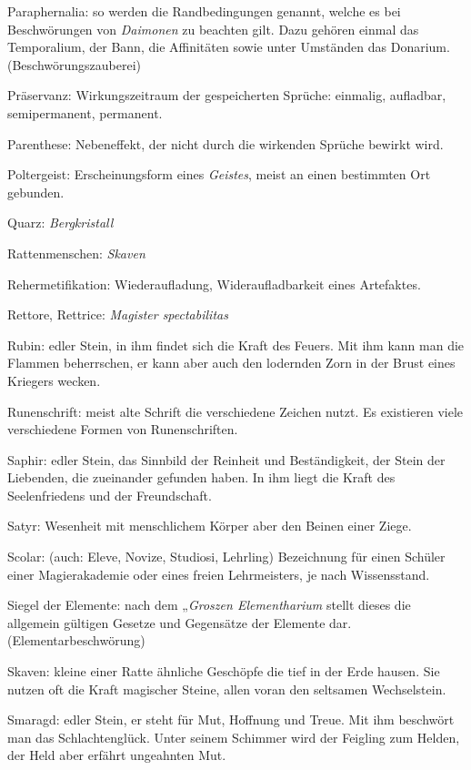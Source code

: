 \documentclass[a5paper,8pt]{book}
\begin{document}
\begin{small}
\begin{description}
 \item Paraphernalia: so werden die Randbedingungen ge­nannt, welche es bei Beschwörungen von \textit{Daimonen} zu beachten gilt. Dazu gehören einmal das \textit{}Temporalium, der Bann, die \textit{}Affinitäten sowie unter Um­ständen das \textit{}Donarium. (\textit{}Beschwörungszauberei)
 \item Präservanz: Wirkungszeitraum der gespeicherten Sprüche: einmalig, aufladbar, semipermanent, permanent.
 \item Parenthese: Nebeneffekt, der nicht durch die wirkenden Sprüche bewirkt wird.
 \item Poltergeist: Erscheinungsform eines \textit{Geistes}, meist an einen bestimmten Ort gebunden.
 \item Quarz: \textit{Bergkristall}
 \item Rattenmenschen: \textit{Skaven}
 \item Rehermetifikation: Wiederaufladung, Wideraufladbarkeit eines Artefaktes.
 \item Rettore, Rettrice: \textit{Magister spectabilitas}
 \item Rubin: edler Stein, in ihm findet sich die Kraft des Feuers. Mit ihm kann man die Flammen beherrschen, er kann aber auch den lodernden Zorn in der Brust eines Kriegers wecken.
 \item Runenschrift: meist alte Schrift die verschiedene Zeichen nutzt. Es existieren viele verschiedene Formen von Runenschriften.
 \item Saphir: edler Stein, das Sinnbild der Rein­heit und Beständigkeit, der Stein der Liebenden, die zueinander gefunden haben. In ihm liegt die Kraft des Seelenfriedens und der Freundschaft.
 \item Satyr: Wesenheit mit menschlichem Körper aber den Beinen einer Ziege.
 \item Scolar: (auch: Eleve, Novize, Studiosi, Lehrling) Bezeichnung für einen Schüler einer Magierakademie oder eines freien Lehr­meisters, je nach Wissensstand. 
 \item Siegel der Elemente: nach dem „\textit{Groszen Elemen­tharium} stellt dieses die allgemein gültigen Gesetze und Gegensätze der Elemente dar. (\textit{}Elementarbeschwörung)
 \item Skaven: kleine einer Ratte ähnliche Geschöpfe die tief in der Erde hausen. Sie nutzen oft die Kraft magischer Steine, allen voran den seltsamen \textit{}Wechselstein. 
 \item Smaragd: edler Stein, er steht für Mut, Hoffnung und Treue. Mit ihm beschwört man das Schlachtenglück. Unter seinem Schimmer wird der Feigling zum Helden, der Held aber erfährt ungeahnten Mut.

\end{description}
\end{small}
\end{document}
